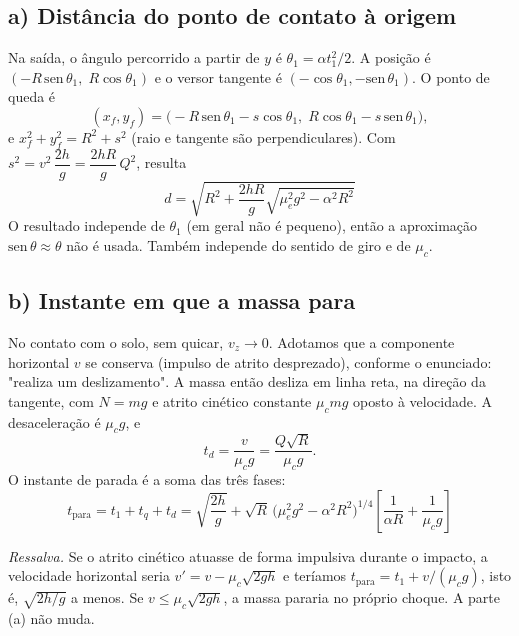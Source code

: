 \documentclass{article}%
\begin{document}
\subsection*{a) Distância do ponto de contato à origem}
Na saída, o ângulo percorrido a partir de $y$ é $\theta_1=\alpha t_1^2/2$. A posição é $(-R\,\mathrm{sen}\,\theta_1,\;R\cos\theta_1)$ e o versor tangente é $(-\cos\theta_1,-\mathrm{sen}\,\theta_1)$. O ponto de queda é
\[
(x_f,y_f)=\big(-R\,\mathrm{sen}\,\theta_1-s\cos\theta_1,\; R\cos\theta_1-s\,\mathrm{sen}\,\theta_1\big),
\]
e $x_f^2+y_f^2=R^2+s^2$ (raio e tangente são perpendiculares). Com $s^2=v^2\,\dfrac{2h}{g}=\dfrac{2hR}{g}\,Q^2$, resulta
\[
\boxed{d=\sqrt{R^2+\frac{2hR}{g}\sqrt{\mu_e^2g^2-\alpha^2R^2}}}
\]
O resultado independe de $\theta_1$ (em geral não é pequeno), então a aproximação $\mathrm{sen}\,\theta\approx\theta$ não é usada. Também independe do sentido de giro e de $\mu_c$.

\subsection*{b) Instante em que a massa para}
No contato com o solo, sem quicar, $v_z\to0$. Adotamos que a componente horizontal $v$ se conserva (impulso de atrito desprezado), conforme o enunciado: "realiza um deslizamento". A massa então desliza em linha reta, na direção da tangente, com $N=mg$ e atrito cinético constante $\mu_c mg$ oposto à velocidade. A desaceleração é $\mu_c g$, e
\[
t_d=\frac{v}{\mu_c g}=\frac{Q\sqrt R}{\mu_c g}.
\]
O instante de parada é a soma das três fases:
\[
\boxed{t_{\text{para}}=t_1+t_q+t_d=\sqrt{\frac{2h}{g}}+\sqrt R\,\big(\mu_e^2g^2-\alpha^2R^2\big)^{1/4}\left[\frac{1}{\alpha R}+\frac{1}{\mu_c g}\right]}
\]

\emph{Ressalva.} Se o atrito cinético atuasse de forma impulsiva durante o impacto, a velocidade horizontal seria $v'=v-\mu_c\sqrt{2gh}$ e teríamos $t_{\text{para}}=t_1+v/(\mu_c g)$, isto é, $\sqrt{2h/g}$ a menos. Se $v\le\mu_c\sqrt{2gh}$, a massa pararia no próprio choque. A parte (a) não muda.
\end{document}
